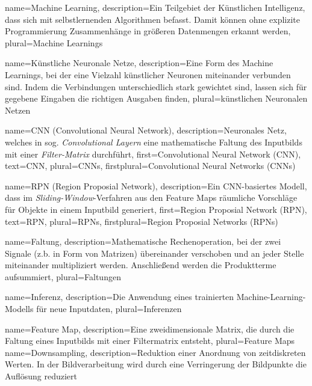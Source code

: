 
{
    name={Machine Learning},
    description={Ein Teilgebiet der Künstlichen
    Intelligenz, dass sich mit selbstlernenden 
    Algorithmen befasst. Damit können ohne explizite  
    Programmierung Zusammenhänge in größeren Datenmengen
    erkannt werden},
    plural={Machine Learnings}
}

{
    name={Künstliche Neuronale Netze},
    description={Eine Form des Machine Learnings, bei der 
    eine Vielzahl künstlicher Neuronen miteinander 
    verbunden sind. Indem die Verbindungen 
    unterschiedlich stark gewichtet sind, lassen 
    sich für gegebene Eingaben die richtigen 
    Ausgaben finden},
    plural={künstlichen Neuronalen Netzen}
}

{
    name={CNN (Convolutional Neural Network)},
    description={Neuronales Netz, welches in 
    sog. \textit{Convolutional Layern} eine mathematische 
    Faltung des Inputbilds mit einer \textit{Filter-Matrix}
    durchführt},
    first={Convolutional Neural Network (CNN)},
    text={CNN},
    plural={CNNs},
    firstplural={Convolutional Neural Networks (CNNs)}
}


{
    name={RPN (Region Proposial Network)},
    description={Ein CNN-basiertes Modell, dass 
    im \textit{Sliding-Window}-Verfahren aus den 
    Feature Maps räumliche Vorschläge für Objekte in
    einem Inputbild generiert},
    first={Region Proposial Network (RPN)},
    text={RPN},
    plural={RPNs},
    firstplural={Region Proposial Networks  (RPNs)}
}


{
    name={Faltung},
    description={Mathematische Rechenoperation, bei der 
    zwei Signale (z.b. in Form von Matrizen) übereinander
    verschoben und an jeder Stelle miteinander
    multipliziert werden. Anschließend 
    werden die Produktterme aufsummiert},
    plural={Faltungen}
}

{
    name={Inferenz},
    description={Die Anwendung 
    eines trainierten Machine-Learning-Modells
    für neue Inputdaten},
    plural={Inferenzen}
}

{
    name={Feature Map},
    description={Eine zweidimensionale Matrix, 
    die durch die Faltung eines Inputbilds mit einer 
    Filtermatrix entsteht},
    plural={Feature Maps}
}
{
    name={Downsampling},
    description={Reduktion einer Anordnung von zeitdiskreten
     Werten. In der Bildverarbeitung wird durch eine Verringerung 
     der Bildpunkte die Auflösung reduziert}
}

